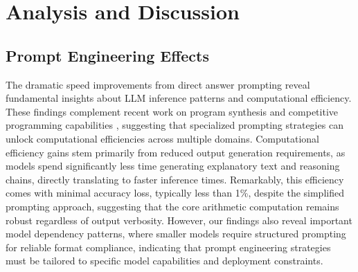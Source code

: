 \documentclass{article}
\begin{document}
\section{Analysis and Discussion}




\subsection{Prompt Engineering Effects}

The dramatic speed improvements from direct answer prompting reveal fundamental insights about LLM inference patterns and computational efficiency. These findings complement recent work on program synthesis \citep{austin2021program} and competitive programming capabilities \citep{li2024code_generation}, suggesting that specialized prompting strategies can unlock computational efficiencies across multiple domains. Computational efficiency gains stem primarily from reduced output generation requirements, as models spend significantly less time generating explanatory text and reasoning chains, directly translating to faster inference times. Remarkably, this efficiency comes with minimal accuracy loss, typically less than 1\%, despite the simplified prompting approach, suggesting that the core arithmetic computation remains robust regardless of output verbosity. However, our findings also reveal important model dependency patterns, where smaller models require structured prompting for reliable format compliance, indicating that prompt engineering strategies must be tailored to specific model capabilities and deployment constraints.
\end{document}
